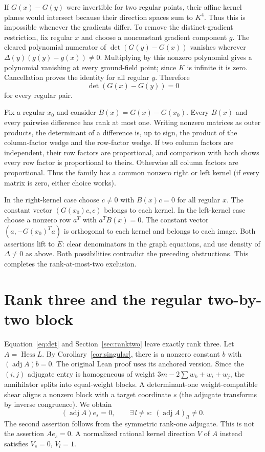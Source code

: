 \documentclass[11pt,a4paper]{article}
\newcommand{\Hess}{\operatorname{Hess}}
\newcommand{\adj}{\operatorname{adj}}
\begin{document}
If $G(x)-G(y)$ were invertible for two regular points, their affine kernel planes would intersect because their direction spaces sum to $K^4$. Thus this is impossible whenever the gradients differ. To remove the distinct-gradient restriction, fix regular $x$ and choose a nonconstant gradient component $g$. The cleared polynomial numerator of $\det(G(y)-G(x))$ vanishes wherever $\Delta(y)(g(y)-g(x))\ne0$. Multiplying by this nonzero polynomial gives a polynomial vanishing at every ground-field point; since $K$ is infinite it is zero. Cancellation proves the identity for all regular $y$. Therefore
\[
 \det(G(x)-G(y))=0
\]
for every regular pair.

Fix a regular $x_0$ and consider $B(x)=G(x)-G(x_0)$. Every $B(x)$ and every pairwise difference has rank at most one. Writing nonzero matrices as outer products, the determinant of a difference is, up to sign, the product of the column-factor wedge and the row-factor wedge. If two column factors are independent, their row factors are proportional, and comparison with both shows every row factor is proportional to theirs. Otherwise all column factors are proportional. Thus the family has a common nonzero right or left kernel (if every matrix is zero, either choice works).

In the right-kernel case choose $c\ne0$ with $B(x)c=0$ for all regular $x$. The constant vector $(G(x_0)c,c)$ belongs to each kernel. In the left-kernel case choose a nonzero row $a^T$ with $a^TB(x)=0$. The constant vector $(a,-G(x_0)^Ta)$ is orthogonal to each kernel and belongs to each image. Both assertions lift to $E$: clear denominators in the graph equations, and use density of $\Delta\ne0$ as above. Both possibilities contradict the preceding obstructions. This completes the rank-at-most-two exclusion.


\section{Rank three and the regular two-by-two block}\label{sec:rankthree}
Equation~\eqref{eq:det} and Section~\ref{sec:ranktwo} leave exactly rank three. Let $A=\Hess L$. By Corollary~\ref{cor:singular}, there is a nonzero constant $b$ with $(\adj A)b=0$. The original Lean proof uses its anchored version. Since the $(i,j)$ adjugate entry is homogeneous of weight $3m-2\sum w_k+w_i+w_j$, the annihilator splits into equal-weight blocks. A determinant-one weight-compatible shear aligns a nonzero block with a target coordinate $s$ (the adjugate transforms by inverse congruence). We obtain
\[
 (\adj A)e_s=0,\qquad \exists\, l\ne s:\ (\adj A)_{ll}\ne0.
\]
The second assertion follows from the symmetric rank-one adjugate. This is not the assertion $Ae_s=0$. A normalized rational kernel direction $V$ of $A$ instead satisfies $V_s=0$, $V_l=1$.
\end{document}
